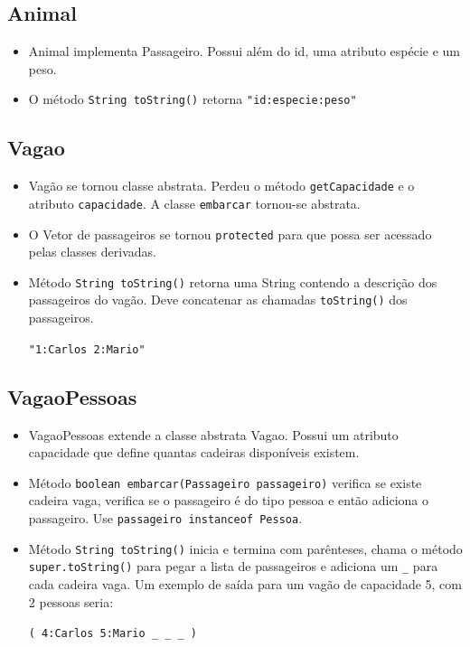 \documentclass[12pt]{article}
\renewcommand{\tt}[1]{\lstinline|#1|}
\begin{document}
\subsection{Animal}
	\begin{itemize}
	\item Animal implementa Passageiro. Possui além do id, uma atributo espécie e um peso.
	\item O método \tt{String toString()} retorna \verb|"id:especie:peso"|
	\end{itemize}
	
\subsection{Vagao}
\begin{itemize}
\item Vagão se tornou classe abstrata. Perdeu o método
\tt{getCapacidade} e o atributo \tt{capacidade}. A classe \tt{embarcar} tornou-se abstrata.
\item O Vetor de passageiros se tornou \tt{protected} para que possa ser acessado pelas classes derivadas.
\item Método \tt{String toString()} retorna uma String contendo a descrição dos passageiros do vagão. Deve
concatenar as chamadas \tt{toString()} dos passageiros.

\verb|"1:Carlos 2:Mario"|

\end{itemize}

\subsection{VagaoPessoas}
\begin{itemize}
\item VagaoPessoas extende a classe abstrata Vagao. Possui um atributo capacidade que define quantas cadeiras disponíveis existem. 
\item Método \tt{boolean embarcar(Passageiro passageiro)} verifica se existe cadeira vaga, verifica se o passageiro é do tipo pessoa e então adiciona o passageiro. Use \tt{passageiro instanceof Pessoa}.
\item Método \tt{String toString()} inicia e termina com parênteses, chama o método \tt{super.toString()} para
pegar a lista de passageiros e adiciona um \tt{_} para cada cadeira vaga. Um exemplo de saída
para um vagão de capacidade 5, com 2 pessoas seria:

\verb|( 4:Carlos 5:Mario _ _ _ )|
\end{itemize}
\end{document}
